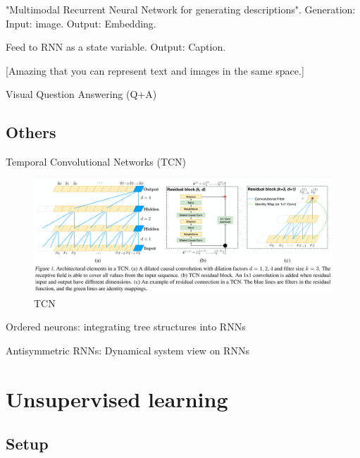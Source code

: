 \documentclass[english]{article}
\begin{document}
\item "Multimodal Recurrent Neural Network for
generating descriptions". Generation: Input: image. Output: Embedding. 

Feed to RNN as a state variable. Output: Caption.

[Amazing that you can represent text and images in the same space.]
\eenum 

\item Visual Question Answering (Q+A)

\benum 
\item 
\eenum 

 
\eenum 


\subsection{Others}


\benum

\item Temporal Convolutional Networks (TCN)


\begin{figure}
  \centering
  \includegraphics[scale=0.5]{tcn.png}
    \caption{TCN}
    \label{TCN}
\end{figure}



\item Ordered neurons: integrating tree structures into RNNs 

\item Antisymmetric RNNs: Dynamical system view on RNNs

\eenum 

\section{Unsupervised learning}

\subsection{Setup}
\end{document}
